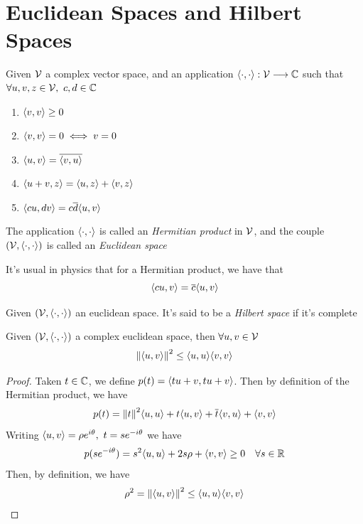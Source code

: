 \documentclass[../complete.tex]{subfiles}
\begin{document}
\section{Euclidean Spaces and Hilbert Spaces}
\begin{dfn}
	Given $\mathcal{V}$ a complex vector space, and an application $\langle \cdot, \cdot \rangle:\mathcal{V}\overset{}{\longrightarrow}\mathbb{C}$ such that $\forall u,v,z\in\mathcal{V},\ c,d\in\mathbb{C}$
	\begin{enumerate}
	\item $\langle v, v \rangle\ge0$
	\item $\langle v, v \rangle=0\iff v=0$
	\item $\langle u, v \rangle=\overline{\langle v, u \rangle}$
	\item $\langle u+v, z \rangle=\langle u, z \rangle+\langle v, z \rangle$
	\item $\langle cu, dv \rangle=c\overline{d}\langle u, v \rangle$
	\end{enumerate}
	The application $\langle \cdot, \cdot \rangle$ is called an \textit{Hermitian product} in $\mathcal{V}$, and the couple $(\mathcal{V},\langle \cdot, \cdot \rangle)$ is called an \textit{Euclidean space}
\end{dfn}
\begin{rmk}
	It's usual in physics that for a Hermitian product, we have that
	\begin{equation}
		\langle cu, v \rangle=\overline{c}\langle u, v \rangle
		\label{eq:physicshermprod}
	\end{equation}
\end{rmk}
\begin{dfn}
	Given $(\mathcal{V},\langle \cdot, \cdot \rangle)$ an euclidean space. It's said to be a \textit{Hilbert space} if it's complete
\end{dfn}
\begin{thm}
	Given $(\mathcal{V},\langle \cdot, \cdot \rangle)$ a complex euclidean space, then $\forall u,v\in\mathcal{V}$
	\begin{equation}
		\norm{\langle u, v \rangle}^2\le\langle u, u \rangle\langle v, v \rangle
		\label{eq:cauchyschwartzineq}
	\end{equation}
\end{thm}
\begin{proof}
	Taken $t\in\mathbb{C}$, we define $p(t)=\langle tu+v, tu+v \rangle$. Then by definition of the Hermitian product, we have
	\begin{equation*}
		p(t)=\norm{t}^2\langle u, u \rangle+t\langle u, v \rangle+\overline{t}\langle v, u \rangle+\langle v, v \rangle
	\end{equation*}
	Writing $\spr{u}{v}=\rho e^{i\theta},\ t=se^{-i\theta}$ we have
	\begin{equation*}
		p(se^{-i\theta})=s^2\langle u, u \rangle+2s\rho+\langle v, v \rangle\ge0\quad\forall s\in\mathbb{R}
	\end{equation*}
	Then, by definition, we have
	\begin{equation*}
		\rho^2=\norm{\langle u, v \rangle}^2\le\langle u, u \rangle\langle v, v \rangle
	\end{equation*}
\end{proof}
\end{document}
